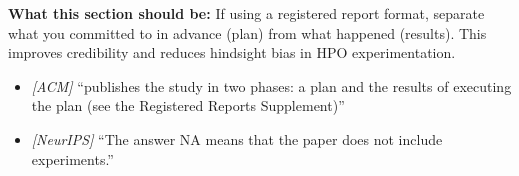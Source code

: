 \noindent\textbf{What this section should be:}
If using a registered report format, separate what you committed to in advance (plan) from what happened (results). This improves credibility and reduces hindsight bias in HPO experimentation.
\begin{itemize}
  \item \textit{[ACM]} ``publishes the study in two phases: a plan and the results of executing the plan (see the Registered Reports Supplement)''
  \item \textit{[NeurIPS]} ``The answer NA means that the paper does not include experiments.''
\end{itemize}